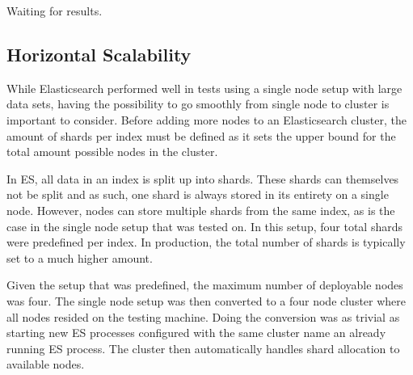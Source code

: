 Waiting for results.
%

\subsection{Horizontal Scalability}
While Elasticsearch performed well in tests using a single node setup with large data sets, having the possibility to go smoothly from single node to cluster is important to consider. Before adding more nodes to an Elasticsearch cluster, the amount of shards per index must be defined as it sets the upper bound for the total amount possible nodes in the cluster.

In ES, all data in an index is split up into shards. These shards can themselves not be split and as such, one shard is always stored in its entirety on a single node. However, nodes can store multiple shards from the same index, as is the case in the single node setup that was tested on. In this setup, four total shards were predefined per index. In production, the total number of shards is typically set to a much higher amount. 

Given the setup that was predefined, the maximum number of deployable nodes was four. The single node setup was then converted to a four node cluster where all nodes resided on the testing machine. Doing the conversion was as trivial as starting new ES processes configured with the same cluster name an already running ES process. The cluster then automatically handles shard allocation to available nodes.

